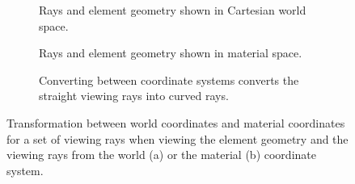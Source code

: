 \begin{figure}
\centering
\begin{subfigure}[b]{0.3\textwidth}
    \caption{Rays and element geometry shown in Cartesian world space.}
    \label{contributions:fem:rays:world}
\end{subfigure}
\hfill
\begin{subfigure}[b]{0.3\textwidth}
    \caption{Rays and element geometry shown in material space.}
    \label{contributions:fem:rays:xi}
\end{subfigure}
\hfill
\begin{subfigure}[b]{0.3\textwidth}
   \caption{Converting between coordinate systems converts the straight viewing rays into curved rays.}
   \label{contributions:fem:rays:rays}
\end{subfigure}
\caption{Transformation between world coordinates and material coordinates for a set of viewing rays when viewing the element geometry and the viewing rays from the world (a) or the material (b) coordinate system.}
\label{contributions:fem:rays}
\end{figure}

